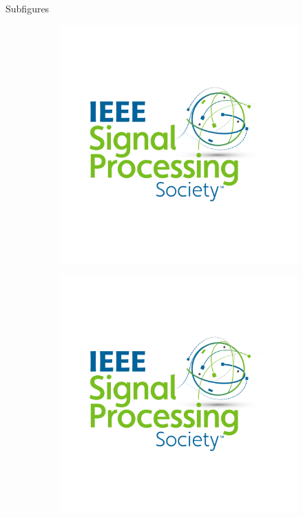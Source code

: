 \documentclass[aspectratio=169]{beamer}
\begin{document}
\begin{frame}{Subfigures}

\begin{figure}
    \centering
    \begin{subfigure}[b]{0.45\linewidth}
        \centering
        \includegraphics[width=\linewidth]{Figures/sps_logo.png}
    \end{subfigure}
    \hfill 
    \begin{subfigure}[b]{0.45\linewidth}
        \centering
        \includegraphics[width=\linewidth]{Figures/sps_logo.png}
    \end{subfigure}
\end{figure}


\end{frame}
\end{document}
